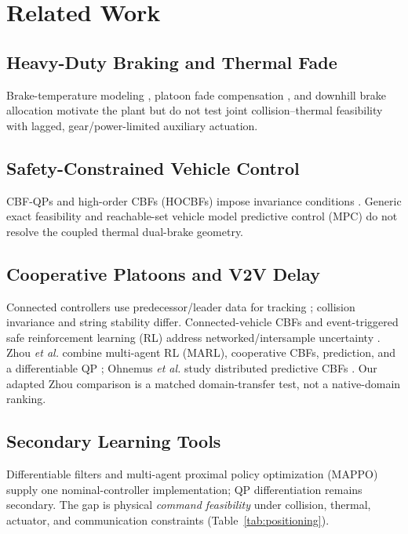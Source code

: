 \section{Related Work}
\subsection{Heavy-Duty Braking and Thermal Fade}
Brake-temperature modeling \cite{talati2009brake}, platoon fade compensation \cite{devika2022fade}, and downhill brake allocation \cite{li2025retarder} motivate the plant but do not test joint collision--thermal feasibility with lagged, gear/power-limited auxiliary actuation.

\subsection{Safety-Constrained Vehicle Control}
CBF-QPs and high-order CBFs (HOCBFs) impose invariance conditions \cite{ames2017cbf,xiao2022hocbf}. Generic exact feasibility \cite{sah2026exact} and reachable-set vehicle model predictive control (MPC) \cite{guo2025uncertainty} do not resolve the coupled thermal dual-brake geometry.

\subsection{Cooperative Platoons and V2V Delay}
Connected controllers use predecessor/leader data for tracking \cite{naus2010string,ploeg2011cacc}; collision invariance and string stability differ. Connected-vehicle CBFs and event-triggered safe reinforcement learning (RL) address networked/intersample uncertainty \cite{li2025connectedcbf,hu2025event}. Zhou \emph{et al.} combine multi-agent RL (MARL), cooperative CBFs, prediction, and a differentiable QP \cite{zhou2026cooperative}; Ohnemus \emph{et al.} study distributed predictive CBFs \cite{ohnemus2026dpcbf}. Our adapted Zhou comparison is a matched domain-transfer test, not a native-domain ranking.

\subsection{Secondary Learning Tools}
Differentiable filters \cite{ma2022differentiable,xiao2023barriernet,yang2023diffcbf} and multi-agent proximal policy optimization (MAPPO) \cite{yu2022mappo} supply one nominal-controller implementation; QP differentiation remains secondary. The gap is physical \emph{command feasibility} under collision, thermal, actuator, and communication constraints (Table~\ref{tab:positioning}).

